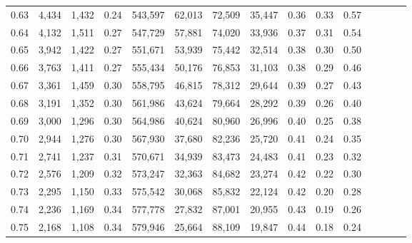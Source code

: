 \begin{tabular}{rrrcrrrrrrrrrrr}
0.63 &   4,434 &  1,432 &                                       0.24 &  543,597 &   62,013 &   72,509 &   35,447 &  0.36 &  0.33 &                         0.57 \\
0.64 &   4,132 &  1,511 &                                       0.27 &  547,729 &   57,881 &   74,020 &   33,936 &  0.37 &  0.31 &                         0.54 \\
0.65 &   3,942 &  1,422 &                                       0.27 &  551,671 &   53,939 &   75,442 &   32,514 &  0.38 &  0.30 &                         0.50 \\
0.66 &   3,763 &  1,411 &                                       0.27 &  555,434 &   50,176 &   76,853 &   31,103 &  0.38 &  0.29 &                         0.46 \\
0.67 &   3,361 &  1,459 &                                       0.30 &  558,795 &   46,815 &   78,312 &   29,644 &  0.39 &  0.27 &                         0.43 \\
0.68 &   3,191 &  1,352 &                                       0.30 &  561,986 &   43,624 &   79,664 &   28,292 &  0.39 &  0.26 &                         0.40 \\
0.69 &   3,000 &  1,296 &                                       0.30 &  564,986 &   40,624 &   80,960 &   26,996 &  0.40 &  0.25 &                         0.38 \\
0.70 &   2,944 &  1,276 &                                       0.30 &  567,930 &   37,680 &   82,236 &   25,720 &  0.41 &  0.24 &                         0.35 \\
0.71 &   2,741 &  1,237 &                                       0.31 &  570,671 &   34,939 &   83,473 &   24,483 &  0.41 &  0.23 &                         0.32 \\
0.72 &   2,576 &  1,209 &                                       0.32 &  573,247 &   32,363 &   84,682 &   23,274 &  0.42 &  0.22 &                         0.30 \\
0.73 &   2,295 &  1,150 &                                       0.33 &  575,542 &   30,068 &   85,832 &   22,124 &  0.42 &  0.20 &                         0.28 \\
0.74 &   2,236 &  1,169 &                                       0.34 &  577,778 &   27,832 &   87,001 &   20,955 &  0.43 &  0.19 &                         0.26 \\
0.75 &   2,168 &  1,108 &                                       0.34 &  579,946 &   25,664 &   88,109 &   19,847 &  0.44 &  0.18 &                         0.24 \\

\end{tabular}
